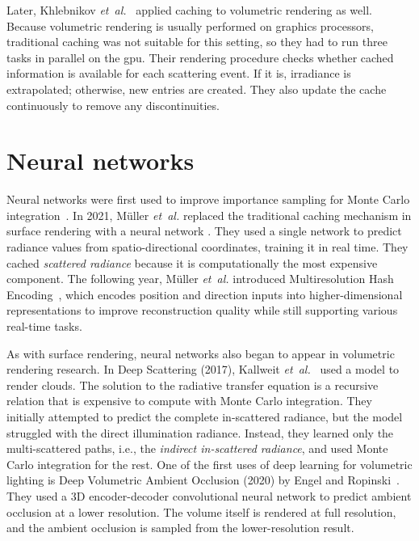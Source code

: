Later, Khlebnikov \emph{et~al.}~\cite{khlebnikov_parallel_2014} applied caching
to volumetric rendering as well. Because volumetric rendering is usually
performed on graphics processors, traditional caching was not suitable
for this setting, so they had to run three tasks in parallel on the \ac{gpu}.
Their rendering procedure checks whether cached information is available for
each scattering event. If it is, irradiance is extrapolated; otherwise, new
entries are created. They also update the cache continuously to remove any
discontinuities.

\section{Neural networks}

Neural networks were first used to improve importance sampling for Monte Carlo
integration~\cite{muller_neural_2019}. In 2021, M\"uller \emph{et~al.} replaced
the traditional caching mechanism in surface rendering with a neural network
\cite{muller_real-time_2021}. They used a single network to predict radiance
values from spatio-directional coordinates, training it in real time. They cached
\emph{scattered radiance} because it is computationally the most expensive
component. The following year, M\"uller \emph{et~al.} introduced Multiresolution
Hash Encoding~\cite{muller_instant_2022}, which encodes position and direction
inputs into higher-dimensional representations to improve reconstruction quality
while still supporting various real-time tasks.

As with surface rendering, neural networks also began to appear in volumetric
rendering research. In Deep Scattering (2017), Kallweit
\emph{et~al.}~\cite{kallweit_deep_2017} used a model to render clouds.
The solution to the radiative transfer equation is a recursive relation that is
expensive to compute with Monte Carlo integration. They initially attempted to
predict the complete in-scattered radiance, but the model struggled with the
direct illumination radiance. Instead, they learned only the multi-scattered
paths, i.e., the \emph{indirect in-scattered radiance}, and used Monte Carlo
integration for the rest. One of the first uses of deep learning for volumetric
lighting is Deep Volumetric Ambient Occlusion (2020) by Engel and
Ropinski~\cite{engel_deep_2021}. They used a 3D encoder-decoder convolutional
neural network to predict ambient occlusion at a lower resolution. The volume
itself is rendered at full resolution, and the ambient occlusion is sampled
from the lower-resolution result.

